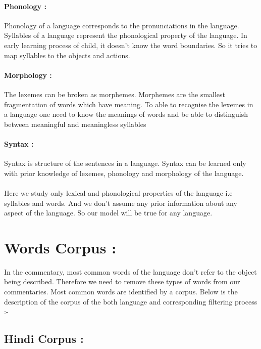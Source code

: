 \def\DevnagVersion{2.15}\documentclass[a4paper, 11pt, notitlepage]{report}
\begin{document}
 \paragraph{Phonology :}
 Phonology of a language corresponds to the pronunciations in the language. Syllables of a language represent the phonological property of the language. In early learning process of child, it doesn't know the word boundaries. So it tries to map syllables to the objects and actions.
 
\paragraph{Morphology :}
The lexemes can be broken as morphemes. Morphemes are the smallest fragmentation of words which have meaning. To able to recognise the lexemes in a language one need to know the meanings of words and be able to distinguish between meaningful and meaningless syllables

\paragraph{Syntax :} 
 Syntax is structure of the sentences in a language. Syntax can be learned only with prior knowledge of lexemes, phonology and morphology of the language.\\ \\

\hspace*{10pt} Here we study only lexical and phonological properties of the language i.e syllables and words. And we don't assume any prior information about any aspect of the language. So our model will be true for any language.

\section{Words Corpus :}

In the commentary, most common words of the language don't refer to the object being described. Therefore we need to remove these types of words from our commentaries.  Most common words are identified by a corpus. Below is the description of the corpus of the both language and corresponding filtering process :- \\

 \subsection{Hindi Corpus :}
 
\end{document}
